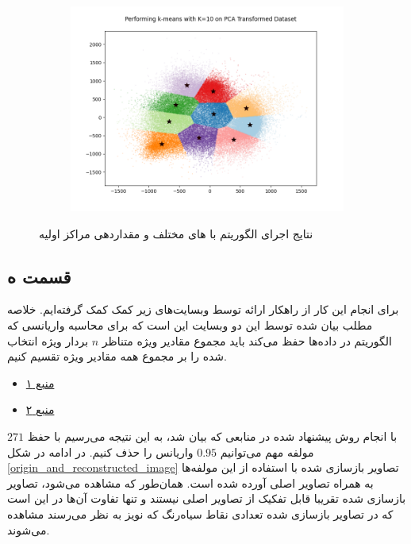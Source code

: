 \documentclass[12pt, a4paper]{article}
\begin{document}
\begin{figure}[h]
\begin{subfigure}{0.32\linewidth}
        \includegraphics[width=\linewidth]{images/q4/d/10.png}
    \end{subfigure}
    \caption{نتایج اجرای الگوریتم 
    با های مختلف و مقداردهی مراکز اولیه}
    \label{q4kmeans_initial_centers_known}
\end{figure}

\clearpage

\subsection*{قسمت ه}

برای انجام این کار از راهکار ارائه توسط وبسایت‌های زیر کمک کمک گرفته‌ایم.
خلاصه مطلب بیان شده توسط این دو وبسایت این است که برای محاسبه واریانسی که
الگوریتم  در داده‌ها حفظ می‌کند باید مجموع مقادیر ویژه متناظر $n$
بردار ویژه انتخاب شده را بر مجموع همه مقادیر ویژه تقسیم کنیم.

\begin{itemize}
    \item \href{https://stats.stackexchange.com/questions/22569/pca-and-proportion-of-variance-explained}{منبع ۱}
    \item \href{https://www.mikulskibartosz.name/pca-how-to-choose-the-number-of-components/}{منبع ۲}
\end{itemize}

با انجام روش پیشنهاد شده در منابعی که بیان شد، به این نتیجه می‌رسیم با حفظ
$271$ مولفه مهم می‌توانیم $0.95$ واریانس را حذف کنیم. در ادامه در شکل
\ref{origin_and_reconstructed_image} تصاویر بازسازی شده با استفاده از
این مولفه‌ها به همراه تصاویر اصلی آورده شده است. همان‌طور که مشاهده می‌شود،
تصاویر بازسازی شده تقریبا قابل تفکیک از تصاویر اصلی نیستند و تنها تفاوت آن‌ها
در این است که در تصاویر باز‌سازی شده تعدادی نقاط سیاه‌رنگ که نویز به نظر
می‌رسند مشاهده می‌شوند.
\end{document}
